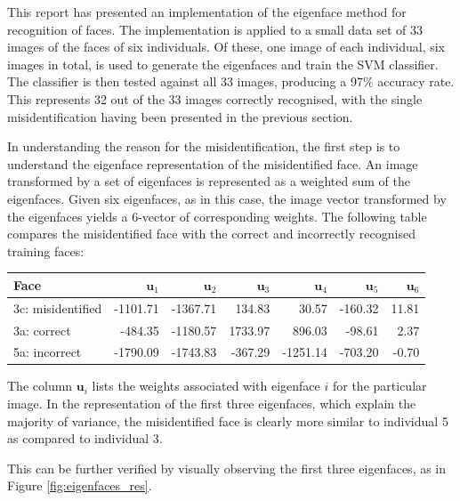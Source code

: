 This report has presented an implementation of the eigenface method for recognition of faces. The implementation is applied to a small data set of 33 images of the faces of six individuals. Of these, one image of each individual, six images in total, is used to generate the eigenfaces and train the SVM classifier. The classifier is then tested against all 33 images, producing a 97\% accuracy rate. This represents 32 out of the 33 images correctly recognised, with the single misidentification having been presented in the previous section.

In understanding the reason for the misidentification, the first step is to understand the eigenface representation of the misidentified face. An image transformed by a set of eigenfaces is represented as a weighted sum of the eigenfaces. Given six eigenfaces, as in this case, the image vector transformed by the eigenfaces yields a 6-vector of corresponding weights. The following table compares the misidentified face with the correct and incorrectly recognised training faces:

\begin{table}[ht]
  \small \centering {}
  \begin{tabularx}{0.78\textwidth}{l r r r r r r}
    \toprule
    \textbf{Face}     & $\bm{u}_1$ & $\bm{u}_2$ & $\bm{u}_3$ & $\bm{u}_4$ & $\bm{u}_5$ & $\bm{u}_6$ \\
    \midrule
    3c: misidentified &   -1101.71 &   -1367.71 &     134.83 &      30.57 &    -160.32 &      11.81 \\
    3a: correct       &    -484.35 &   -1180.57 &    1733.97 &     896.03 &     -98.61 &       2.37 \\
    5a: incorrect     &   -1790.09 &   -1743.83 &    -367.29 &   -1251.14 &    -703.20 &      -0.70 \\
    \bottomrule
  \end{tabularx}
\end{table}

The column $\bm{u}_i$ lists the weights associated with eigenface $i$ for the particular image. In the representation of the first three eigenfaces, which explain the majority of variance, the misidentified face is clearly more similar to individual 5 as compared to individual 3.

This can be further verified by visually observing the first three eigenfaces, as in Figure \ref{fig:eigenfaces_res}.

